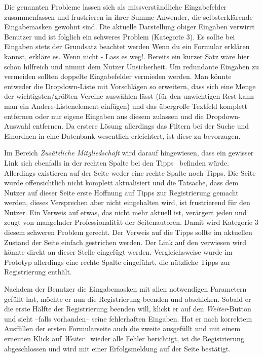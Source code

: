 { Die genannten Probleme lassen sich als missverständliche Eingabefelder zusammenfassen und frustrieren in ihrer Summe Anwender, die selbsterklärende Eingabemasken gewohnt sind. Die aktuelle Darstellung obiger Eingaben verwirrt Benutzer und ist folglich ein schweres Problem (Kategorie 3).
}{
Es sollte bei Eingaben stets der Grundsatz beachtet werden \glqq Wenn du ein Formular erklären kannst, erkläre es. Wenn nicht - Lass es weg!\grqq. Bereits ein kurzer Satz wäre hier schon hilfreich und nimmt dem Nutzer Unsicherheit. Um redundante Eingaben zu vermeiden sollten doppelte Eingabefelder vermieden werden. Man könnte entweder die Dropdown-Liste mit Vorschlägen so erweitern, dass sich eine Menge der wichtigsten/größten Vereine auswählen lässt (für den unwichtigen Rest kann man ein \glqq Andere\grqq-Listenelement einfügen) und das übergroße Textfeld komplett entfernen oder nur eigene Eingaben aus diesem zulassen und die Dropdown-Auswahl entfernen. Da erstere Lösung allerdings das Filtern bei der Suche und Einordnen in eine Datenbank wesentlich erleichtert, ist diese zu bevorzugen.}
\label{prob:reg:unclearinput}


{ Im Bereich \emph{Zusätzliche Mitgliedschaft} wird darauf hingewiesen, dass ein gewisser Link sich ebenfalls in der \glqq rechten Spalte bei den Tipps\grqq ~ befinden würde. Allerdings existieren auf der Seite weder eine rechte Spalte noch Tipps. Die Seite wurde offensichtlich nicht komplett aktualisiert und die Tatsache, dass dem Nutzer auf dieser Seite erste Hoffnung auf Tipps zur Registrierung gemacht werden, dieses Versprechen aber nicht eingehalten wird, ist frustrierend für den Nutzer.
}
{ Ein Verweis auf etwas, das nicht mehr aktuell ist, verärgert jeden und zeugt von mangelnder Professionalität der Seitenautoren. Damit wird Kategorie 3 diesem schweren Problem gerecht.
}
{ Der Verweis auf die Tipps sollte im aktuellen Zustand der Seite einfach gestrichen werden. Der Link auf den verwiesen wird könnte direkt an dieser Stelle eingefügt werden. Vergleichsweise wurde im Prototyp allerdings eine rechte Spalte eingeführt, die nützliche Tipps zur Registrierung enthält.
} 
\label{prob:reg:missingtipps}


Nachdem der Benutzer die Eingabemasken mit allen notwendigen Parametern gefüllt hat, möchte er nun die Registrierung beenden und abschicken. Sobald
er die erste Hälfte der Registrierung beenden will, klickt er auf den \emph{Weiter}-Button und sieht --falls vorhanden-- seine fehlerhaften Eingaben. Hat er nach korrektem
Ausfüllen der ersten Formularseite auch die zweite ausgefüllt und mit einem erneuten Klick auf \emph{Weiter} ~wieder alle Fehler berichtigt, ist die Registrierung abgeschlossen und wird mit einer Erfolgsmeldung auf der Seite bestätigt.

